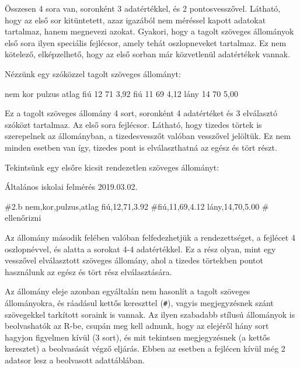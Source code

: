 \documentclass[
]{book}
\newenvironment{Shaded}{\begin{snugshade}}{\end{snugshade}}
\newcommand{\NormalTok}[1]{#1}
\begin{document}
Összesen 4 sora van, soronként 3 adatértékkel, és 2 pontosvesszővel. Látható, hogy az első sor kitüntetett, azaz igazából nem méréssel kapott adatokat tartalmaz, hanem megnevezi azokat. Gyakori, hogy a tagolt szöveges állományok első sora ilyen speciális fejlécsor, amely tehát oszlopneveket tartalmaz. Ez nem kötelező, elképzelhető, hogy az első sorban már közvetlenül adatértékek vannak.

Nézzünk egy szóközzel tagolt szöveges állományt:

\begin{Shaded}
\begin{Highlighting}[]
\NormalTok{nem kor pulzus atlag}
\NormalTok{fiú 12 71 3,92}
\NormalTok{fiú 11 69 4,12}
\NormalTok{lány 14 70 5,00}
\end{Highlighting}
\end{Shaded}

Ez a tagolt szöveges állomány 4 sort, soronként 4 adatértéket és 3 elválasztó szóközt tartalmaz. Az első sora fejlécsor. Látható, hogy tizedes törtek is szerepelnek az állományban, a tizedesvesszőt valóban vesszővel jelöltük. Ez nem minden esetben van így, tizedes pont is elválaszthatná az egész és tört részt.

Tekintsünk egy elsőre kicsit rendezetlen szöveges állományt:

\begin{Shaded}
\begin{Highlighting}[]
\NormalTok{Általános iskolai felmérés}
\NormalTok{2019.03.02.}

\NormalTok{\#2.b}
\NormalTok{nem,kor,pulzus,atlag}
\NormalTok{fiú,12,71,3.92}
\NormalTok{\#fiú,11,69,4.12}
\NormalTok{lány,14,70,5.00 \# ellenőrizni}
\end{Highlighting}
\end{Shaded}

Az állomány második felében valóban felfedezhetjük a rendezettséget, a fejlécet 4 oszlopnévvel, és alatta a sorokat 4-4 adatértékkel. Ez a rész olyan, mint egy vesszővel elválasztott szöveges állomány, ahol a tizedes törtekben pontot használunk az egész és tört rész elválasztására.

Az állomány eleje azonban egyáltalán nem hasonlít a tagolt szöveges állományokra, és ráadásul kettős kereszttel (\texttt{\#}), vagyis megjegyzésnek szánt szövegekkel tarkított soraink is vannak. Az ilyen szabadabb stílusú állományok is beolvashatók az R-be, csupán meg kell adnunk, hogy az elejéről hány sort hagyjon figyelmen kívül (3 sort), és mit tekintsen megjegyzésnek (a kettős keresztet) a beolvasását végző eljárás. Ebben az esetben a fejlécen kívül még 2 adatsor lesz a beolvasott adattáblában.
\end{document}
